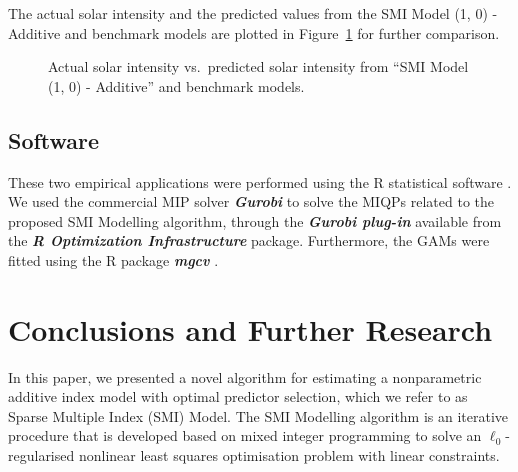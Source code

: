 \documentclass[
  11pt,
  a4paper,
]{article}
\begin{document}
The actual solar intensity and the predicted values from the SMI Model
(1, 0) - Additive and benchmark models are plotted in
Figure~\ref{fig-solarPred} for further comparison.

\begin{figure}


\caption{\label{fig-solarPred}Actual solar intensity vs.~predicted solar
intensity from ``SMI Model (1, 0) - Additive'' and benchmark models.}

\end{figure}%

\subsection{Software}\label{software}

These two empirical applications were performed using the R statistical
software \autocite{Rcore}. We used the commercial MIP solver
\textbf{\emph{Gurobi}} \autocite{gurobi2023} to solve the MIQPs related
to the proposed SMI Modelling algorithm, through the
\textbf{\emph{Gurobi plug-in}}
\autocite[ROI.plugin.gurobi,][]{Schwendinger2023} available from the
\textbf{\emph{R Optimization Infrastructure}}
\autocites[ROI,][]{Hornik2023,Theusl2020} package. Furthermore, the GAMs
were fitted using the R package \textbf{\emph{mgcv}}
\autocite{mgcv,Wood2011}.

\section{Conclusions and Further Research}\label{sec-conclusion}

In this paper, we presented a novel algorithm for estimating a
nonparametric additive index model with optimal predictor selection,
which we refer to as Sparse Multiple Index (SMI) Model. The SMI
Modelling algorithm is an iterative procedure that is developed based on
mixed integer programming to solve an \(\ell_{0}\)-regularised nonlinear
least squares optimisation problem with linear constraints.
\end{document}

